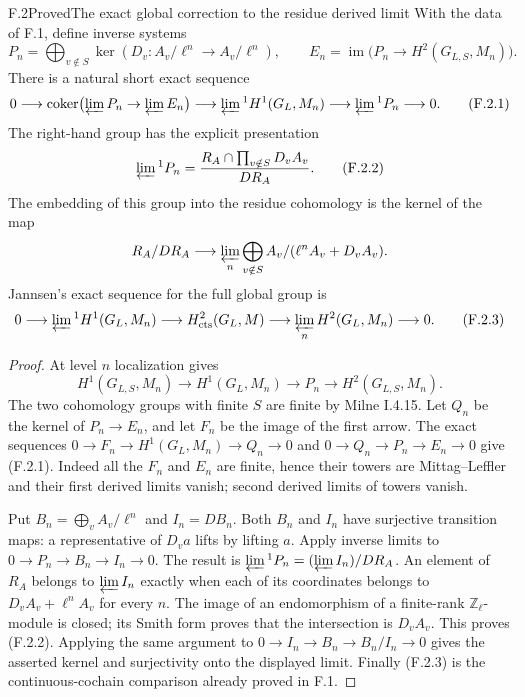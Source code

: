 \begin{statement}{F.2}{Proved}{The exact global correction to the residue derived limit}
With the data of F.1, define inverse systems
\[
 P_n=\bigoplus_{v\notin S}\ker(D_v:A_v/\ell^n\to A_v/\ell^n),
 \qquad
 E_n=\operatorname{im}\bigl(P_n\to H^2(G_{L,S},M_n)\bigr).
\]
There is a natural short exact sequence
\[
 0\longrightarrow
 \operatorname{coker}\bigl(\varprojlim P_n\to\varprojlim E_n\bigr)
 \longrightarrow \varprojlim{}^1 H^1(G_L,M_n)
 \longrightarrow \varprojlim{}^1 P_n\longrightarrow0.       \tag{F.2.1}
\]
The right-hand group has the explicit presentation
\[
 \varprojlim{}^1 P_n
 =
 \frac{R_A\cap\prod_{v\notin S}D_vA_v}{DR_A}.                \tag{F.2.2}
\]
The embedding of this group into the residue cohomology is the kernel of the map
\[
 R_A/DR_A\longrightarrow
 \varprojlim_n\bigoplus_{v\notin S}
     A_v/(\ell^n A_v+D_vA_v).
\]
Jannsen's exact sequence for the full global group is
\[
 0\longrightarrow\varprojlim{}^1 H^1(G_L,M_n)
 \longrightarrow H^2_{\mathrm{cts}}(G_L,M)
 \longrightarrow\varprojlim_n H^2(G_L,M_n)
 \longrightarrow0.                                      \tag{F.2.3}
\]
\end{statement}
\begin{proof}
At level $n$ localization gives
\[
 H^1(G_{L,S},M_n)\longrightarrow H^1(G_L,M_n)
 \longrightarrow P_n\longrightarrow H^2(G_{L,S},M_n).
\]
The two cohomology groups with finite $S$ are finite by Milne I.4.15. Let $Q_n$ be the kernel of $P_n\to E_n$, and let $F_n$ be the image of the first arrow. The exact sequences
$0\to F_n\to H^1(G_L,M_n)\to Q_n\to0$ and
$0\to Q_n\to P_n\to E_n\to0$ give (F.2.1). Indeed all the $F_n$ and $E_n$ are finite, hence their towers are Mittag--Leffler and their first derived limits vanish; second derived limits of towers vanish.

Put $B_n=\bigoplus_v A_v/\ell^n$ and $I_n=DB_n$. Both $B_n$ and $I_n$ have surjective transition maps: a representative of $D_v a$ lifts by lifting $a$. Apply inverse limits to $0\to P_n\to B_n\to I_n\to0$. The result is
$\varprojlim{}^1P_n=(\varprojlim I_n)/D R_A$.
An element of $R_A$ belongs to $\varprojlim I_n$ exactly when each of its coordinates belongs to $D_vA_v+\ell^n A_v$ for every $n$. The image of an endomorphism of a finite-rank $\mathbb Z_\ell$-module is closed; its Smith form proves that the intersection is $D_vA_v$. This proves (F.2.2). Applying the same argument to $0\to I_n\to B_n\to B_n/I_n\to0$ gives the asserted kernel and surjectivity onto the displayed limit. Finally (F.2.3) is the continuous-cochain comparison already proved in F.1.
\end{proof}

